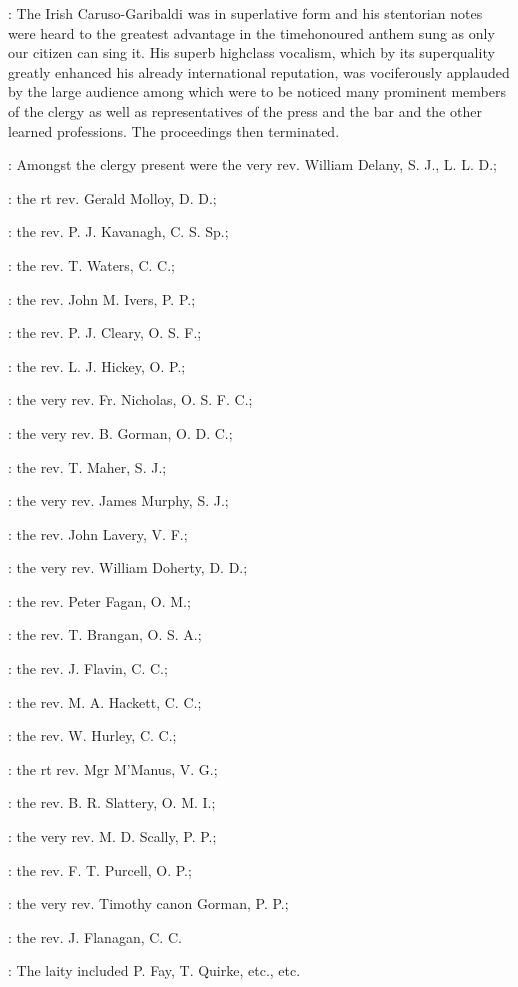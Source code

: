 :
The Irish Caruso-Garibaldi
was in superlative form and his stentorian notes were heard to the
greatest advantage in the timehonoured anthem sung as only our citizen
can sing it. His superb highclass vocalism, which by its superquality
greatly enhanced his already international reputation, was vociferously
applauded by the large audience among which were to be noticed many
prominent members of the clergy as well as representatives of the press
and the bar and the other learned professions. The proceedings then
terminated.

:
Amongst the clergy present were
the very rev. William Delany, S. J., L. L. D.;

:
the rt rev. Gerald Molloy, D. D.;

:
the rev. P. J. Kavanagh, C. S. Sp.;

:
the rev. T. Waters, C. C.; 

:
the rev. John M. Ivers, P. P.; 

:
the rev. P. J. Cleary, O. S. F.; 

:
the rev. L. J. Hickey, O. P.; 

:
the very rev. Fr. Nicholas, O. S. F. C.; 

:
the very rev. B. Gorman, O. D. C.; 

:
the rev. T. Maher, S. J.; 

:
the very rev. James Murphy, S. J.; 

:
the rev. John Lavery, V. F.; 

:
the very rev. William Doherty, D. D.; 

:
the rev. Peter Fagan, O. M.; 

:
the rev. T. Brangan, O. S. A.; 

:
the rev. J. Flavin, C. C.; 

:
the rev. M. A. Hackett, C. C.; 

:
the rev. W. Hurley, C. C.; 

:
the rt rev. Mgr M'Manus, V. G.; 

:
the rev. B. R. Slattery, O. M. I.; 

:
the very rev. M. D. Scally, P. P.; 

:
the rev. F. T. Purcell, O. P.; 

:
the very rev. Timothy canon Gorman, P. P.; 

:
the rev. J. Flanagan, C. C. 

:
The laity included P. Fay, T. Quirke, etc., etc.

